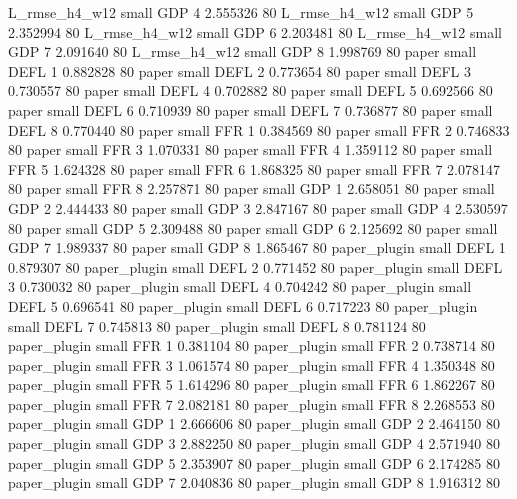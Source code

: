 L_rmse_h4_w12      small      GDP                 4 2.555326 80
L_rmse_h4_w12      small      GDP                 5 2.352994 80
L_rmse_h4_w12      small      GDP                 6 2.203481 80
L_rmse_h4_w12      small      GDP                 7 2.091640 80
L_rmse_h4_w12      small      GDP                 8 1.998769 80
        paper      small     DEFL                 1 0.882828 80
        paper      small     DEFL                 2 0.773654 80
        paper      small     DEFL                 3 0.730557 80
        paper      small     DEFL                 4 0.702882 80
        paper      small     DEFL                 5 0.692566 80
        paper      small     DEFL                 6 0.710939 80
        paper      small     DEFL                 7 0.736877 80
        paper      small     DEFL                 8 0.770440 80
        paper      small      FFR                 1 0.384569 80
        paper      small      FFR                 2 0.746833 80
        paper      small      FFR                 3 1.070331 80
        paper      small      FFR                 4 1.359112 80
        paper      small      FFR                 5 1.624328 80
        paper      small      FFR                 6 1.868325 80
        paper      small      FFR                 7 2.078147 80
        paper      small      FFR                 8 2.257871 80
        paper      small      GDP                 1 2.658051 80
        paper      small      GDP                 2 2.444433 80
        paper      small      GDP                 3 2.847167 80
        paper      small      GDP                 4 2.530597 80
        paper      small      GDP                 5 2.309488 80
        paper      small      GDP                 6 2.125692 80
        paper      small      GDP                 7 1.989337 80
        paper      small      GDP                 8 1.865467 80
 paper_plugin      small     DEFL                 1 0.879307 80
 paper_plugin      small     DEFL                 2 0.771452 80
 paper_plugin      small     DEFL                 3 0.730032 80
 paper_plugin      small     DEFL                 4 0.704242 80
 paper_plugin      small     DEFL                 5 0.696541 80
 paper_plugin      small     DEFL                 6 0.717223 80
 paper_plugin      small     DEFL                 7 0.745813 80
 paper_plugin      small     DEFL                 8 0.781124 80
 paper_plugin      small      FFR                 1 0.381104 80
 paper_plugin      small      FFR                 2 0.738714 80
 paper_plugin      small      FFR                 3 1.061574 80
 paper_plugin      small      FFR                 4 1.350348 80
 paper_plugin      small      FFR                 5 1.614296 80
 paper_plugin      small      FFR                 6 1.862267 80
 paper_plugin      small      FFR                 7 2.082181 80
 paper_plugin      small      FFR                 8 2.268553 80
 paper_plugin      small      GDP                 1 2.666606 80
 paper_plugin      small      GDP                 2 2.464150 80
 paper_plugin      small      GDP                 3 2.882250 80
 paper_plugin      small      GDP                 4 2.571940 80
 paper_plugin      small      GDP                 5 2.353907 80
 paper_plugin      small      GDP                 6 2.174285 80
 paper_plugin      small      GDP                 7 2.040836 80
 paper_plugin      small      GDP                 8 1.916312 80